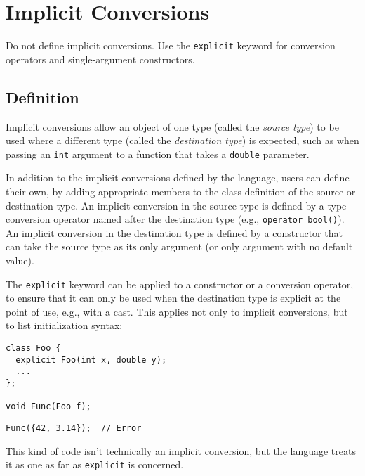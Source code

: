 
\section{Implicit Conversions}\label{sec:implicit-conversions}
Do not define implicit conversions. Use the \texttt{explicit} keyword for conversion operators and single-argument constructors.

\subsection{Definition}
Implicit conversions allow an object of one type (called the \emph{source type}) to be used where a different type (called the \emph{destination type}) is expected, such as when passing an \texttt{int} argument to a function that takes a \texttt{double} parameter.

In addition to the implicit conversions defined by the language, users can define their own, by adding appropriate members to the class definition of the source or destination type. An implicit conversion in the source type is defined by a type conversion operator named after the destination type (e.g., \texttt{operator bool()}). An implicit conversion in the destination type is defined by a constructor that can take the source type as its only argument (or only argument with no default value).

The \texttt{explicit} keyword can be applied to a constructor or a conversion operator, to ensure that it can only be used when the destination type is explicit at the point of use, e.g., with a cast. This applies not only to implicit conversions, but to list initialization syntax:
\begin{verbatim}
class Foo {
  explicit Foo(int x, double y);
  ...
};

void Func(Foo f);
\end{verbatim}
\begin{verbatim}
Func({42, 3.14});  // Error
\end{verbatim}
This kind of code isn't technically an implicit conversion, but the language treats it as one as far as \texttt{explicit} is concerned.

